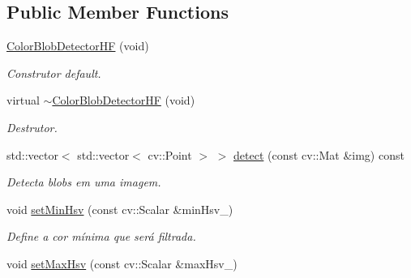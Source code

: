\subsection*{Public Member Functions}
\begin{DoxyCompactItemize}
\item 
\hypertarget{class_viscv_1_1_color_blob_detector_h_f_a22080136627bd90459c3a7cc68db48fc}{}\hyperlink{class_viscv_1_1_color_blob_detector_h_f_a22080136627bd90459c3a7cc68db48fc}{Color\+Blob\+Detector\+H\+F} (void)\label{class_viscv_1_1_color_blob_detector_h_f_a22080136627bd90459c3a7cc68db48fc}

\begin{DoxyCompactList}\small\item\em Construtor default. \end{DoxyCompactList}\item 
\hypertarget{class_viscv_1_1_color_blob_detector_h_f_a1a287459fc13984350ba9e1d68eac14e}{}virtual \hyperlink{class_viscv_1_1_color_blob_detector_h_f_a1a287459fc13984350ba9e1d68eac14e}{$\sim$\+Color\+Blob\+Detector\+H\+F} (void)\label{class_viscv_1_1_color_blob_detector_h_f_a1a287459fc13984350ba9e1d68eac14e}

\begin{DoxyCompactList}\small\item\em Destrutor. \end{DoxyCompactList}\item 
\hypertarget{class_viscv_1_1_color_blob_detector_h_f_a76311b08b5cb9df65524e070e9c15048}{}std\+::vector$<$ std\+::vector$<$ cv\+::\+Point $>$ $>$ \hyperlink{class_viscv_1_1_color_blob_detector_h_f_a76311b08b5cb9df65524e070e9c15048}{detect} (const cv\+::\+Mat \&img) const \label{class_viscv_1_1_color_blob_detector_h_f_a76311b08b5cb9df65524e070e9c15048}

\begin{DoxyCompactList}\small\item\em Detecta blobs em uma imagem. \end{DoxyCompactList}\item 
\hypertarget{class_viscv_1_1_color_blob_detector_h_f_ae985929bdd9605ac5ab2460f6b824a97}{}void \hyperlink{class_viscv_1_1_color_blob_detector_h_f_ae985929bdd9605ac5ab2460f6b824a97}{set\+Min\+Hsv} (const cv\+::\+Scalar \&min\+Hsv\+\_\+)\label{class_viscv_1_1_color_blob_detector_h_f_ae985929bdd9605ac5ab2460f6b824a97}

\begin{DoxyCompactList}\small\item\em Define a cor mínima que será filtrada. \end{DoxyCompactList}\item 
\hypertarget{class_viscv_1_1_color_blob_detector_h_f_a842c89f58a06bc5d08b555e0ebcce3a4}{}void \hyperlink{class_viscv_1_1_color_blob_detector_h_f_a842c89f58a06bc5d08b555e0ebcce3a4}{set\+Max\+Hsv} (const cv\+::\+Scalar \&max\+Hsv\+\_\+)\label{class_viscv_1_1_color_blob_detector_h_f_a842c89f58a06bc5d08b555e0ebcce3a4}


\end{DoxyCompactItemize}
